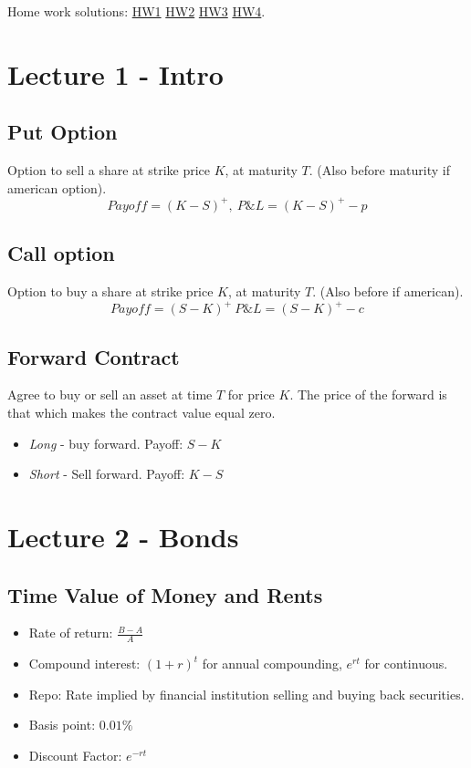 \documentclass{article}
\begin{document}
\thispagestyle{fancy}


Home work solutions: \href{https://github.com/juliusolson/IE420/blob/master/hw1/hw1.pdf}{HW1} \href{https://github.com/juliusolson/IE420/blob/master/hw2/hw2.pdf}{HW2} \href{https://github.com/juliusolson/IE420/blob/master/hw3/hw3.pdf}{HW3} \href{https://github.com/juliusolson/IE420/blob/master/hw4/hw4.pdf}{HW4}.


\section*{Lecture 1 - Intro}

\subsection*{Put Option}

Option to sell a share at strike price $K$, at maturity $T$. (Also before maturity if american option).
$$Payoff = (K-S)^+, \ P\&L = (K-S)^+ - p$$

\subsection*{Call option}

Option to buy a share at strike price $K$, at maturity $T$. (Also before if american).
$$ Payoff = (S-K)^+ \ P\&L = (S-K)^+ - c $$

\subsection*{Forward Contract}
Agree to buy or sell an asset at time $T$ for price $K$. The price of the forward is that which makes the contract value equal zero. 

\begin{itemize}
	\item \textit{Long} - buy forward. Payoff: $S-K$ 
	\item \textit{Short} - Sell forward. Payoff: $K-S$
\end{itemize}

\section*{Lecture 2 - Bonds}

\subsection*{Time Value of Money and Rents}
\begin{itemize}
	\item Rate of return: $\frac{B - A}{A}$
	\item Compound interest: $(1 + r)^t$ for annual compounding, $e^{rt}$ for continuous.
	\item Repo: Rate implied by financial institution selling and buying back securities. 
	\item Basis point: $0.01\%$
	\item Discount Factor: $e^{-rt}$ 
\end{itemize}
\end{document}
